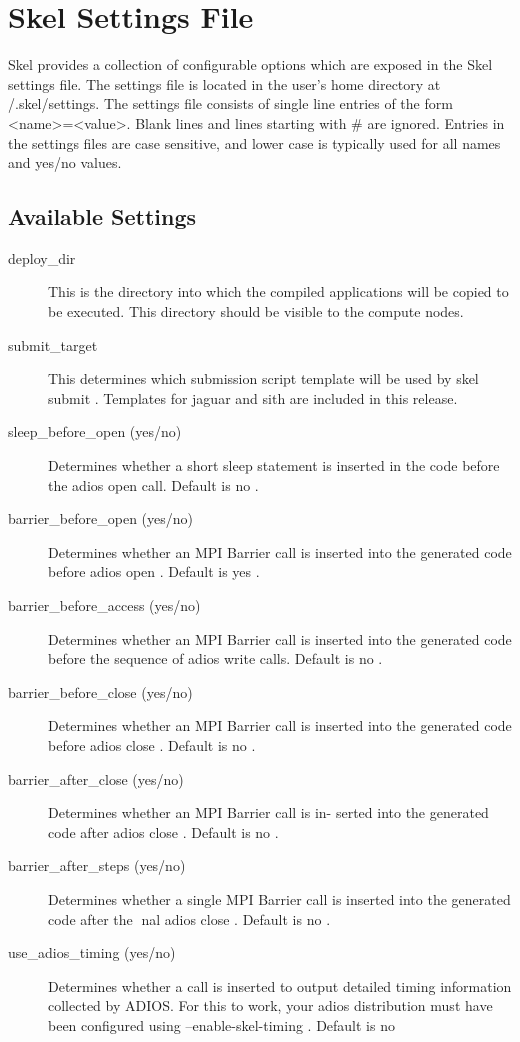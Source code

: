 

\chapter{Skel Settings File}
Skel provides a collection of configurable options which are exposed in the
Skel settings file. The settings file is located in the user's home directory at
/.skel/settings.
The settings file consists of single line entries of the form
<name>=<value>.
Blank lines and lines starting with \# are ignored. Entries in the settings files are
case sensitive, and lower case is typically used for all names and yes/no values.
\section{Available Settings}
\begin{description}
  \item[deploy\_dir]
This is the directory into which the compiled applications will be
copied to be executed. This directory should be visible to the compute
nodes.
  \item[submit\_target]
This determines which submission script template will be used
by
skel submit
. Templates for
jaguar
and
sith
are included in this
release.
  \item[sleep\_before\_open (yes/no)]
Determines whether a short
sleep
statement is
inserted in the code before the
adios
open
call. Default is
no
.
  \item[barrier\_before\_open (yes/no)]
Determines whether an
MPI
Barrier
call is
inserted into the generated code before
adios
open
. Default is
yes
.
  \item[barrier\_before\_access (yes/no)]
Determines whether an
MPI
Barrier
call is
inserted into the generated code before the sequence of
adios
write
calls.
Default is
no
.
  \item[barrier\_before\_close (yes/no)]
Determines whether an
MPI
Barrier
call is
inserted into the generated code before
adios
close
. Default is
no
.
  \item[barrier\_after\_close (yes/no)]
Determines whether an
MPI
Barrier
call is in-
serted into the generated code after
adios
close
. Default is
no
.
  \item[barrier\_after\_steps (yes/no)]
Determines whether a single
MPI
Barrier
call
is inserted into the generated code after the nal
adios
close
. Default is
no
.
  \item[use\_adios\_timing (yes/no)]
Determines whether a call is inserted to output
detailed timing information collected by ADIOS. For this to work, your
adios distribution must have been configured using
--enable-skel-timing
.
Default is
no
\end{description}

